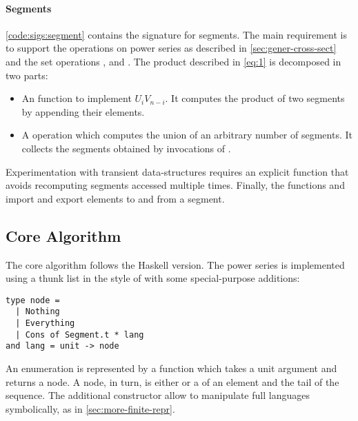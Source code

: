 \paragraph{Segments}

\autoref{code:sigs:segment} contains the signature for segments.
The main requirement is to support the operations on power series as described in \autoref{sec:gener-cross-sect} and the set operations
,  and .
%
The product described in \autoref{eq:1} is decomposed in two parts:
\begin{itemize}[leftmargin=*]
\item An  function to implement $U_i V_{n-i}$. It computes the
  product of two segments by appending their elements.
\item A  operation which computes the union of an arbitrary number
  of segments. It collects the segments obtained
  by invocations of .
\end{itemize}
%
Experimentation with transient data-structures requires
an explicit  function that avoids recomputing segments accessed
multiple times. 
%
Finally, the functions   and  import and
export elements to and from a segment.

\subsection{Core Algorithm}

The core algorithm follows the Haskell version. The power series
is implemented using a thunk list in the style of \citet{DBLP:conf/cpp/Pottier17}
with some special-purpose additions:

\begin{lstlisting}
type node =
  | Nothing
  | Everything
  | Cons of Segment.t * lang
and lang = unit -> node
\end{lstlisting}

An enumeration is represented by a function which takes a unit argument and returns
a node. A node, in turn, is either  or a  of an
element and the tail of the sequence.
The additional constructor  allow to manipulate
full languages symbolically, as in \cref{sec:more-finite-repr}.

